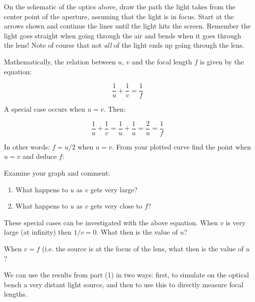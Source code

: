 \noindent On the schematic of the optics above, draw the path the
light takes from the center point of the aperture, assuming that the
light is in focus. Start at the arrows shown and continue the lines
until the light hits the screen. Remember the light goes straight when
going through the air and bends when it goes through the lens! Note of
course that not {\it all} of the light ends up going through the lens.

\noindent Mathematically, the relation between $u$, $v$ and the focal
length $f$ is given by the equation:

\begin{equation}
\frac{1}{u} + \frac{1}{v} = \frac{1}{f}
\end{equation}

\noindent A special case occurs when $u=v$.  Then:

\begin{equation}
\frac{1}{u}+\frac{1}{v} = \frac{1}{u}+\frac{1}{u} = \frac{2}{u}
=\frac{1}{f}
\end{equation}

\noindent In other words: $f=u/2$ when $u=v$.  From your plotted curve
find the point when $u=v$ and deduce $f$:

\vspace{30pt}

\noindent Examine your graph and comment:
\begin{enumerate}
\item What happens to $u$ as $v$ gets very large? \vspace{20pt}
\item What happens to $u$ as $v$ gets very close to $f$? \vspace{20pt}
\end{enumerate}
\noindent These special cases can be investigated with the above
equation.  When $v$ is very large (at infinity) then $1/v=0$.  What
then is the value of $u$?

\vspace{30pt}

\noindent When $v=f$ (i.e. the source is at the focus of the lens, what then is
the value of $u$?

\vspace{30pt}


\noindent We can use the results from part (1) in two ways: first, to
simulate on the optical bench a very distant light source, and then to
use this to directly measure focal lengths.

